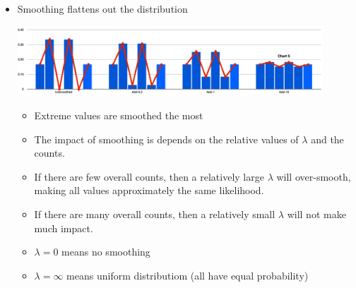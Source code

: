 \documentclass[11pt,letterpaper]{article}
\begin{document}
\begin{itemize}
  \item Smoothing flattens out the distribution
    \begin{center}\includegraphics[width=0.9\textwidth]{smoothing.png}\end{center}

    \begin{itemize}
      \item Extreme values are smoothed the most
      \item The impact of smoothing is depends on the relative values of $\lambda$ and the counts.
      \item If there are few overall counts, then a relatively large $\lambda$ will over-smooth, making all values approximately the same likelihood.
      \item If there are many overall counts, then a relatively small $\lambda$ will not make much impact.
      \item $\lambda=0$ means no smoothing
      \item $\lambda=\infty$ means uniform distributiom (all have equal probability)
    \end{itemize}


\end{itemize}
\end{document}
